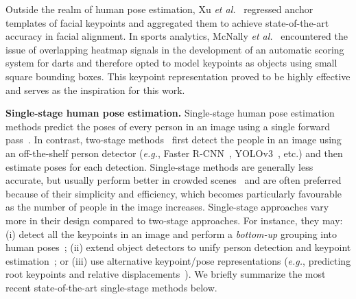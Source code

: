 \documentclass[runningheads]{llncs}
\newcommand{\etal}{\textit{et al.}}
\newcommand{\eg}{\textit{e.g.}}
\newcommand\hlll[1]{\bgroup
  \hskip0pt\color{black}#1\egroup
}
\begin{document}
Outside the realm of human pose estimation, Xu \etal~\cite{xu2021anchorface} regressed anchor templates of facial keypoints and aggregated them to achieve state-of-the-art accuracy in facial alignment. In sports analytics, McNally \etal~\cite{mcnally2021deepdarts} encountered the issue of overlapping heatmap signals in the development of an automatic scoring system for darts and therefore opted to model keypoints as objects using small square bounding boxes. This keypoint representation proved to be highly effective and serves as the inspiration for \hlll{this} work. 

\smallskip\noindent\textbf{Single-stage human pose estimation.}
Single-stage human pose estimation methods predict the poses of every person in an image using a single forward pass~\cite{cao2017realtime, newell2017associative, he2017mask, kreiss2019pifpaf, cheng2020higherhrnet,geng2021bottom, nie2019single}. In contrast, two-stage methods~\cite{papandreou2017towards, fang2017rmpe, chen2018cascaded, xiao2018simple, sun2019deep, mcnally2021evopose2d, khirodkar2021multi, li2021human} first detect \hlll{the} people in an image using an off-the-shelf person detector (\eg, Faster R-CNN~\cite{ren2015faster}, YOLOv3~\cite{redmon2018yolov3}, etc.) and then estimate poses for each detection. Single-stage methods are generally less accurate, but usually perform better in crowded scenes~\cite{li2019crowdpose} and are often preferred because of their simplicity and efficiency, which becomes particularly favourable as the number of people in the image increases. Single-stage approaches vary more in their design compared to two-stage approaches. For instance, they may: (i) detect all the keypoints in an image and perform a \textit{bottom-up} grouping into human poses~\cite{pishchulin2016deepcut, insafutdinov2016deepercut, iqbal2016multi, cao2017realtime, newell2017associative, cheng2020higherhrnet, kreiss2019pifpaf, jin2020differentiable, braso2021center, luo2021rethinking}; (ii) extend object detectors to unify person detection and keypoint estimation~\cite{he2017mask, wei2020point, zhou2019objects, mao2021fcpose}; or (iii) use alternative keypoint/pose representations (\eg, predicting root keypoints and relative displacements~\cite{papandreou2018personlab, nie2019single, geng2021bottom}). We briefly summarize the most recent state-of-the-art single-stage methods below. 
\end{document}
